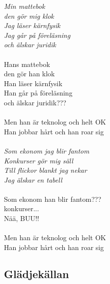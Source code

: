 \noindent\textit{Min mattebok \\
den gör mig klok\\
Jag läser kärnfysik\\
Jag går på föreläsning\\
och älskar juridik}\\\\
\noindent Hans mattebok\\
den gör han klok\\
Han läser kärnfysik\\
Han går på föreläsning\\
och älskar juridik???\\\\
\noindent Men han är teknolog och helt OK\\
Han jobbar hårt och han roar sig\\\\
\noindent\textit{Som ekonom jag blir fantom\\
Konkurser gör mig säll\\
Till flickor blankt jag nekar\\
Jag älskar en tabell}\\\\
\noindent Som ekonom han blir fantom???\\
konkurser...\\
Nää, BUU!!\\\\
\noindent Men han är teknolog och helt OK\\
Han jobbar hårt och han roar sig\\


\newpage
\enlargethispage{2cm}

\subsection*{Glädjekällan} 

